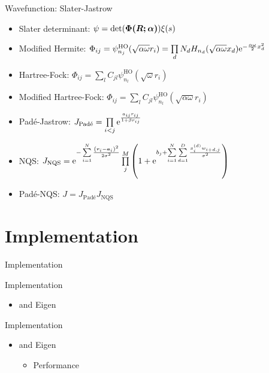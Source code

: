 \documentclass[10pt, t, xcolor=dvipsnames]{beamer}
\begin{document}
\begin{frame}[fragile]{Wavefunction: Slater-Jastrow}
    \begin{itemize}
        \item Slater determinant: $\psi =
            \det(\blds{\Phi(\blds{R};\blds{\alpha})}) \xi(s)$
        \item Modified Hermite: $\Phi_{ij} =
            \psi^{\text{HO}}_{n_j}(\sqrt{\alpha\omega}r_i) = \prod\limits_d N_d
            H_{n_d}(\sqrt{\alpha \omega}x_d)\me^{-\frac{\alpha\omega}{2}x^2_d}$
        \item Hartree-Fock: $\Phi_{ij} =
            \sum\limits_lC_{jl}\psi^{\text{HO}}_{n_l}\left(\sqrt{\omega}r_i\right)$
        \item Modified Hartree-Fock: $\Phi_{ij} =
            \sum\limits_lC_{jl}\psi^{\text{HO}}_{n_l}\left(\sqrt{\alpha\omega}r_i\right)$
        \item Pad\'e-Jastrow: $J_{\text{Pad\'e}} = \prod\limits_{i<j}
            \me^{\frac{a_{ij} r_{ij}}{1 + \beta r_{ij}}}$
        \item NQS: $J_{\text{NQS}} = \me^{-\suml{i=1}{N} \frac{\left(\bm{r}_i -
            \bm{a}_i\right)^2}{2\sigma^2}}\prod\limits^{M}_j \left(1 + \me^{b_j
            + \suml{i=1}{N}\suml{d=1}{D}
            \frac{x^{(d)}_iw_{i+d,j}}{\sigma^2}}\right)$
        \item Pad\'e-NQS: $J = J_{\text{Pad\'e}}J_{\text{NQS}}$
    \end{itemize}
\end{frame}

\section{Implementation}

\begin{frame}[fragile]{Implementation}
\end{frame}

\begin{frame}[fragile]{Implementation}
    \begin{itemize}
        \item \CC and Eigen
    \end{itemize}
\end{frame}

\begin{frame}[fragile]{Implementation}
    \begin{itemize}
        \item \CC and Eigen
            \begin{itemize}
                \item Performance
            \end{itemize}
    \end{itemize}
\end{frame}
\end{document}
